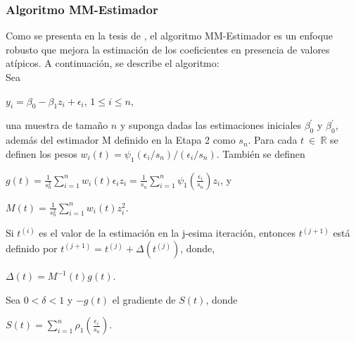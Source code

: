 \subsubsection{ Algoritmo MM-Estimador \parencite{zacarias-2023} }
Como se presenta en la tesis de \textcite{zacarias-2023}, el algoritmo MM-Estimador es un enfoque robusto que mejora la estimación de los coeficientes en presencia de valores atípicos. A continuación, se describe el algoritmo:\\

Sea\\
\begin{center}
 $ y_{i} = \beta_{0} -\beta_{1}z_{i} + \epsilon_{i} $, $1 \leq i \leq n $,\\
\end{center}

una muestra de tamaño $n$ y suponga dadas las estimaciones iniciales $\beta_{0}^{'}$ y $\beta_{0}^{'}$, además del estimador M definido en la Etapa 2 como $s_{n}$. Para cada $t \: \in  \: \mathbb{R} $ se definen los pesos
$w_{i}(t) = \psi_{1} (\epsilon_{i} /s_{n}) /(\epsilon_{i} /s_{n})$. También se definen \\


\begin{center}
	{\large $g(t) = \frac{1}{s_{n}^{2}} \sum_{i=1}^{n} w_{i}( t )\epsilon_{i} z_{i} =  \frac{1}{s_{n}}  \sum_{i=1}^{n} \psi_{1} (\frac{\epsilon_{i}}{s_{n}}) z_{i}$}, y \\	
\end{center}

\begin{center}
	{\large$ M(t) = \frac{1}{s_{n}^{2}}  \sum_{i=1}^{n}  w_{i}( t ) z_{i}^{2} $}.\\
\end{center}





Si $t^{(i)}$ es el valor de la estimación en la j-esima iteración, entonces $t^{(j+1)}$ está definido por $t^{(j+1)} = t^{(j)} + \Delta ( t^{(j)})$, donde,\\

\begin{center}
	$\Delta ( t) = M^{-1}(t)g(t)$.\\
\end{center}

Sea $0< \delta  < 1$  y $-g(t)$ el gradiente de $S(t)$, donde \\

\begin{center}
	{\large$S(t) = \sum_{i=1}^{n} \rho_{1} ( \frac{\epsilon_{i}}{s_{n}})$}. \\
\end{center}


